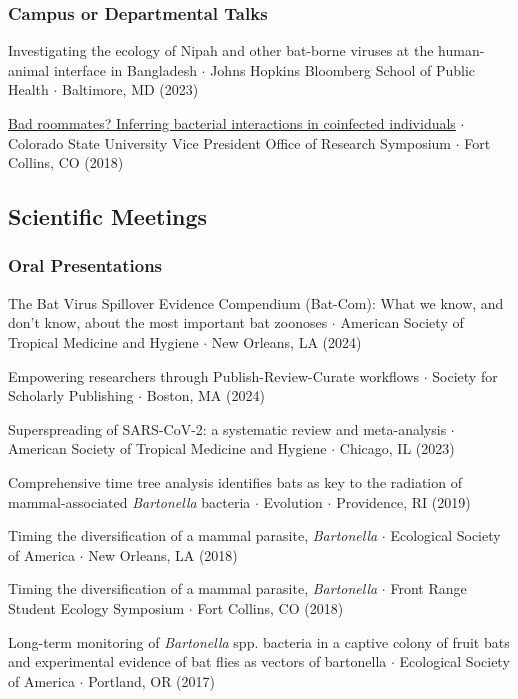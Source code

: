 \documentclass{cv}
\begin{document}
\subsubsection*{Campus or Departmental Talks}

Investigating the ecology of Nipah and other bat-borne viruses at the human-animal interface in Bangladesh $\cdot$ Johns Hopkins Bloomberg School of Public Health $\cdot$ Baltimore, MD (2023)

\href{https://www.youtube.com/watch?v=lYWR_dZRdjE}{Bad roommates? Inferring bacterial interactions in coinfected individuals} $\cdot$ Colorado State University Vice President Office of Research Symposium $\cdot$ Fort Collins, CO (2018)

\subsection*{Scientific Meetings}

\subsubsection*{Oral Presentations}

The Bat Virus Spillover Evidence Compendium (Bat-Com): What we know, and don’t know, about the most important bat zoonoses $\cdot$ American Society of Tropical Medicine and Hygiene $\cdot$ New Orleans, LA (2024)

Empowering researchers through Publish-Review-Curate workflows $\cdot$ Society for Scholarly Publishing $\cdot$ Boston, MA (2024)

Superspreading of SARS-CoV-2: a systematic review and meta-analysis $\cdot$ American Society of Tropical Medicine and Hygiene $\cdot$ Chicago, IL (2023)

Comprehensive time tree analysis identifies bats as key to the radiation of mammal-associated \textit{Bartonella} bacteria $\cdot$ Evolution $\cdot$ Providence, RI (2019)

Timing the diversification of a mammal parasite, \textit{Bartonella} $\cdot$ Ecological Society of America $\cdot$ New Orleans, LA (2018)

Timing the diversification of a mammal parasite, \textit{Bartonella} $\cdot$ Front Range Student Ecology Symposium $\cdot$ Fort Collins, CO (2018)

Long-term monitoring of \textit{Bartonella} spp. bacteria in a captive colony of fruit bats and experimental evidence of bat flies as vectors of bartonella $\cdot$ Ecological Society of America $\cdot$ Portland, OR (2017)
\end{document}
